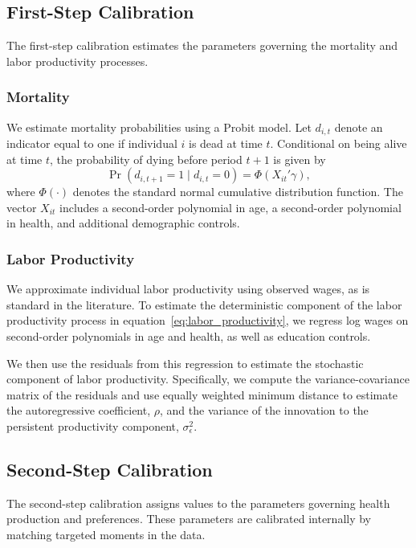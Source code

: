 \documentclass[12pt,a4paper]{article}
\begin{document}
\subsection{First-Step Calibration}

The first-step calibration estimates the parameters governing the mortality and labor productivity processes.

\subsubsection{Mortality}

We estimate mortality probabilities using a Probit model. Let $d_{i,t}$ denote an indicator equal to one if individual $i$ is dead at time $t$. Conditional on being alive at time $t$, the probability of dying before period $t+1$ is given by
\begin{equation}
\label{eq:probit}
    \Pr(d_{i,t+1}=1 \mid d_{i,t}=0)=\Phi(X_{it}'\gamma),
\end{equation}
where $\Phi(\cdot)$ denotes the standard normal cumulative distribution function. The vector $X_{it}$ includes a second-order polynomial in age, a second-order polynomial in health, and additional demographic controls.

\subsubsection{Labor Productivity}

We approximate individual labor productivity using observed wages, as is standard in the literature. To estimate the deterministic component of the labor productivity process in equation~\eqref{eq:labor_productivity}, we regress log wages on second-order polynomials in age and health, as well as education controls.

We then use the residuals from this regression to estimate the stochastic component of labor productivity. Specifically, we compute the variance-covariance matrix of the residuals and use equally weighted minimum distance to estimate the autoregressive coefficient, $\rho$, and the variance of the innovation to the persistent productivity component, $\sigma_{\epsilon}^{2}$.

\subsection{Second-Step Calibration}

The second-step calibration assigns values to the parameters governing health production and preferences. These parameters are calibrated internally by matching targeted moments in the data.
\end{document}
